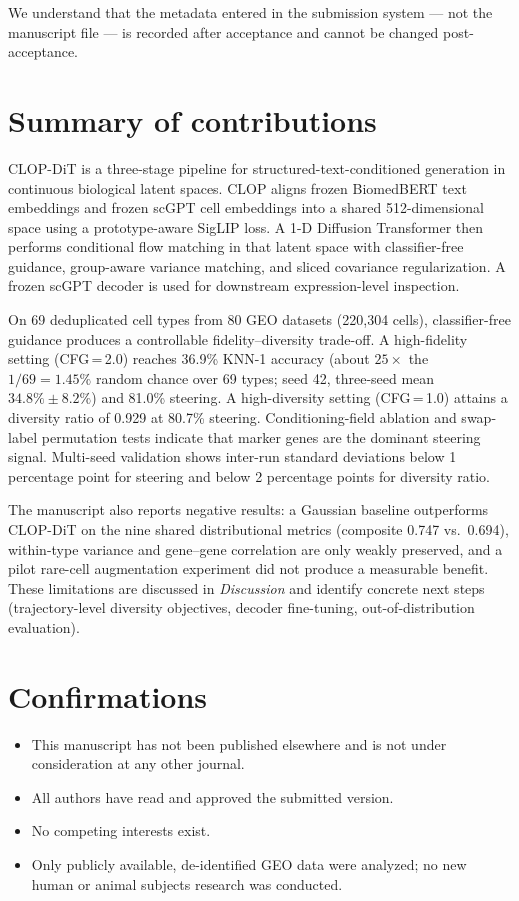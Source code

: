 \documentclass[11pt,letterpaper]{article}
\begin{document}
We understand that the metadata entered in the submission system --- not the manuscript file --- is recorded after acceptance and cannot be changed post-acceptance.

\section*{Summary of contributions}

CLOP-DiT is a three-stage pipeline for structured-text-conditioned generation in continuous biological latent spaces. CLOP aligns frozen BiomedBERT text embeddings and frozen scGPT cell embeddings into a shared 512-dimensional space using a prototype-aware SigLIP loss. A 1-D Diffusion Transformer then performs conditional flow matching in that latent space with classifier-free guidance, group-aware variance matching, and sliced covariance regularization. A frozen scGPT decoder is used for downstream expression-level inspection.

On 69 deduplicated cell types from 80 GEO datasets (220{,}304 cells), classifier-free guidance produces a controllable fidelity--diversity trade-off. A high-fidelity setting (CFG\,=\,2.0) reaches 36.9\% KNN-1 accuracy (about $25\times$ the $1/69 = 1.45\%$ random chance over 69 types; seed 42, three-seed mean $34.8\% \pm 8.2\%$) and 81.0\% steering. A high-diversity setting (CFG\,=\,1.0) attains a diversity ratio of 0.929 at 80.7\% steering. Conditioning-field ablation and swap-label permutation tests indicate that marker genes are the dominant steering signal. Multi-seed validation shows inter-run standard deviations below 1 percentage point for steering and below 2 percentage points for diversity ratio.

The manuscript also reports negative results: a Gaussian baseline outperforms CLOP-DiT on the nine shared distributional metrics (composite 0.747 vs.\ 0.694), within-type variance and gene--gene correlation are only weakly preserved, and a pilot rare-cell augmentation experiment did not produce a measurable benefit. These limitations are discussed in \emph{Discussion} and identify concrete next steps (trajectory-level diversity objectives, decoder fine-tuning, out-of-distribution evaluation).

\section*{Confirmations}

\begin{itemize}
  \item This manuscript has not been published elsewhere and is not under consideration at any other journal.
  \item All authors have read and approved the submitted version.
  \item No competing interests exist.
  \item Only publicly available, de-identified GEO data were analyzed; no new human or animal subjects research was conducted.
\end{itemize}
\end{document}
